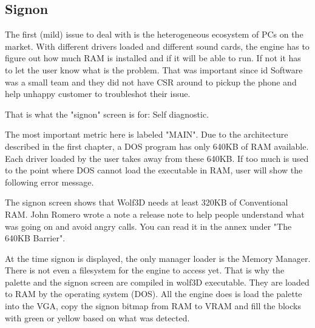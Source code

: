 \documentclass[book.tex]{subfiles}
\begin{document}
\subsection{Signon}
The first (mild) issue to deal with is the heterogeneous ecosystem of PCs on the market. With different drivers loaded and different sound cards, the engine has to figure out how much RAM is installed and if it will be able to run. If not it has to let the user know what is the problem. That was important since id Software was a small team and they did not have CSR around to pickup the phone and help unhappy customer to troubleshot their issue.\\
\par
That is what the "signon" screen is for: Self diagnostic. 
\par
\begin{figure}[H]
\centering
{}
\end{figure}
\par
The most important metric here is labeled "MAIN". Due to the architecture described in the first chapter, a DOS program has only 640KB of RAM available. Each driver loaded by the user takes away from these 640KB. If too much is used to the point where DOS cannot load the executable in RAM, user will show the following error message.\\
\par 
\begin{minipage}{\textwidth}

\end{minipage}
\par
The signon screen shows that Wolf3D needs at least 320KB of Conventional RAM. John Romero wrote a note a release note to help people understand what was going on and avoid angry calls. You can read it in the annex under "The 640KB Barrier".
\par 
At the time signon is displayed, the only manager loader is the Memory Manager. There is not even a filesystem for the engine to access yet. That is why the palette and the signon screen are compiled in wolf3D executable. They are loaded to RAM by the operating system (DOS). All the engine does is load the palette into the VGA, copy the signon bitmap from RAM to VRAM and fill the blocks with green or yellow based on what was detected.\\
\par
\begin{minipage}{\textwidth}

\end{minipage}
\end{document}
